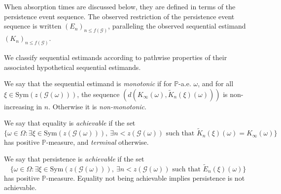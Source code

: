 \documentclass{article}
\begin{document}
When absorption times are discussed below, they are defined in terms of the persistence event sequence. The observed restriction of the persistence event sequence is written $(E_n)_{n \le f(\mathcal G)}$, paralleling the observed sequential estimand $(K_n)_{n \le f(\mathcal G)}$.

We classify sequential estimands according to pathwise properties of their associated hypothetical sequential estimands.

We say that the sequential estimand is \textit{monotonic} if for $\mathbb{P}$-a.e. $\omega$, and for all $\xi \in \mathrm{Sym}(z(\mathcal{G}(\omega)))$, the sequence $(d(K_\infty(\omega), \widetilde K_n(\xi)(\omega)))$ is non-increasing in $n$. Otherwise it is \textit{non-monotonic}.

We say that equality is \textit{achievable} if the set
\[
\{\omega \in \Omega : \exists \xi \in \mathrm{Sym}(z(\mathcal{G}(\omega))),\ \exists n < z(\mathcal{G}(\omega)) \text{ such that } \widetilde K_n(\xi)(\omega) = K_\infty(\omega)\}
\]
has positive $\mathbb{P}$-measure, and \textit{terminal} otherwise.

We say that persistence is \textit{achievable} if the set
\[
\{\omega \in \Omega : \exists \xi \in \mathrm{Sym}(z(\mathcal{G}(\omega))),\ \exists n < z(\mathcal{G}(\omega)) \text{ such that } \widetilde E_n(\xi)(\omega)\}
\]
has positive $\mathbb{P}$-measure. Equality not being achievable implies persistence is not achievable.
\end{document}
